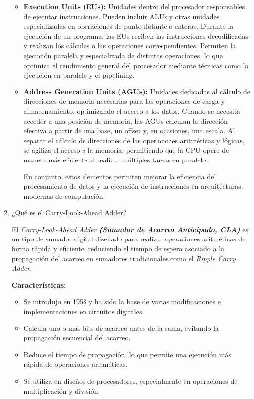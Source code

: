 \documentclass[12pt,letterpaper]{article}
\begin{document}
\begin{enumerate}
\begin{itemize}
    \item \textbf{Execution Units (EUs):} Unidades dentro del procesador responsables de ejecutar instrucciones. Pueden incluir ALUs y otras unidades especializadas en operaciones de punto flotante o enteras. Durante la ejecución de un programa, las EUs reciben las instrucciones decodificadas y realizan los cálculos o las operaciones correspondientes. Permiten la ejecución paralela y especializada de distintas operaciones, lo que optimiza el rendimiento general del procesador mediante técnicas como la ejecución en paralelo y el pipelining.
    
    \item \textbf{Address Generation Units (AGUs):} Unidades dedicadas al cálculo de direcciones de memoria necesarias para las operaciones de carga y almacenamiento, optimizando el acceso a los datos. Cuando se necesita acceder a una posición de memoria, las AGUs calculan la dirección efectiva a partir de una base, un offset y, en ocasiones, una escala. Al separar el cálculo de direcciones de las operaciones aritméticas y lógicas, se agiliza el acceso a la memoria, permitiendo que la CPU opere de manera más eficiente al realizar múltiples tareas en paralelo.
    
    En conjunto, estos elementos permiten mejorar la eficiencia del procesamiento de datos y la ejecución de instrucciones en arquitecturas modernas de computación.
    \end{itemize}
    \bigskip
    
  \item ¿Qu\'{e} es el Carry-Look-Ahead Adder?
    
    \bigskip
    El \textit{Carry-Look-Ahead Adder \textbf{(Sumador de Acarreo Anticipado, CLA)}} es un tipo de sumador digital diseñado para realizar operaciones aritméticas de forma rápida y eficiente, reduciendo el tiempo de espera asociado a la propagación del acarreo en sumadores tradicionales como el \textit{Ripple Carry Adder}.
    
    \textbf{Características:}
    \begin{itemize}
    \item Se introdujo en 1958 y ha sido la base de varias modificaciones e implementaciones en circuitos digitales.
    \item Calcula uno o más bits de acarreo antes de la suma, evitando la propagación secuencial del acarreo.
    \item Reduce el tiempo de propagación, lo que permite una ejecución más rápida de operaciones aritméticas.
    \item Se utiliza en diseños de procesadores, especialmente en operaciones de multiplicación y división.
    \end{itemize}


\end{enumerate}
\end{document}
